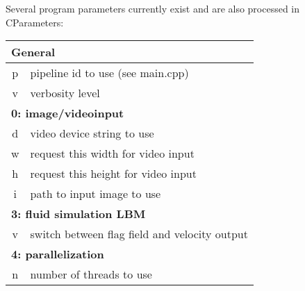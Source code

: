 Several program parameters currently exist and are also processed in
CParameters:

\noindent
\begin{tabular}{|c|l|}
	\hline
	\multicolumn{2}{|l|}{\textbf{General}}	\\
	\hline
	p	& pipeline id to use (see main.cpp)	\\
	\hline
	v	& verbosity level	\\
	\hline
	\hline

	\multicolumn{2}{|l|}{\textbf{0: image/videoinput}}	\\
	\hline
	d	& video device string to use\\
	\hline
	w	& request this width for video input\\
	\hline
	h	& request this height for video input\\
	\hline
	i	& path to input image to use\\
	\hline
	\hline

	\multicolumn{2}{|l|}{\textbf{3: fluid simulation LBM}}	\\
	\hline
	v	& switch between flag field and velocity output	\\
	\hline
	\hline
	
	\multicolumn{2}{|l|}{\textbf{4: parallelization}}	\\
	\hline
	n	& number of threads to use\\
	\hline
	\hline

\end{tabular}
\newpage